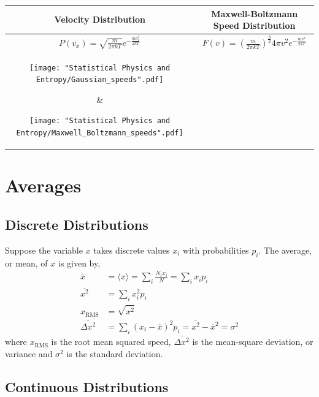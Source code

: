 \documentclass[british]{article}
\providecommand{\tabularnewline}{\\}
\renewcommand{\d}{\mathrm{d}} %
\begin{document}
\begin{center}
\begin{tabular}{c|c}
\textbf{Velocity Distribution}  & \textbf{Maxwell-Boltzmann Speed Distribution}\tabularnewline
\hline \hline
${\displaystyle {P(v_{x})=\sqrt{\frac{m}{2\pi kT}}e^{-\frac{mv_{x}^{2}}{2kT}}}}$  & ${\displaystyle {F(v)=\left(\frac{m}{2\pi kT}\right)^{\frac{3}{2}}4\pi v^{2}e^{-\frac{mv^{2}}{2kT}}}}$\tabularnewline
\parbox[c]{23em}{%
\texttt{[image: "Statistical Physics and Entropy/Gaussian\_speeds".pdf]}} & \parbox[c]{23em}{\texttt{[image: "Statistical Physics and Entropy/Maxwell\_Boltzmann\_speeds".pdf]}
}\tabularnewline
${\displaystyle {\int_{-\infty}^{+\infty}P(v_{x})\d{v_{x}}=P_{0}\int_{-\infty}^{+\infty}e^{-\frac{mv_{x}^{2}}{2kT}}\d{v_{x}}=1}}$  & ${\displaystyle {\int_{0}^{\infty}F(v)\d{v}=4\pi F_{0}\int_{0}^{\infty}v^{2}e^{-\frac{mv^{2}}{2kT}}\d{v}=1}}$\tabularnewline
\end{tabular}
\par\end{center}


\section{Averages}


\subsection{Discrete Distributions}

Suppose the variable $x$ takes discrete values $x_{i}$ with probabilities $p_{i}$. The average, or mean, of $x$ is given by, 
\begin{align*}
\overline{x} & =\langle x\rangle=\sum_{i}\frac{N_{i}x_{i}}{N}=\sum_{i}x_{i}p_{i}\\
\overline{x^{2}} & =\sum_{i}x_{i}^{2}p_{i}\\
x_{\text{RMS}} & =\sqrt{\overline{x^{2}}}\\
\overline{\Delta x^{2}} & =\sum_{i}\left(x_{i}-\overline{x}\right)^{2}p_{i}=\overline{x^{2}}-{\overline{x}}^{2}=\sigma^{2}
\end{align*}
where $x_{\text{RMS}}$ is the root mean squared speed, $\overline{\Delta x^{2}}$ is the mean-square deviation, or variance and $\sigma^{2}$ is the standard deviation.


\subsection{Continuous Distributions}
\end{document}
